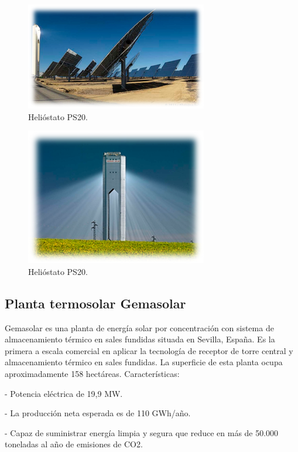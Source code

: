 \begin{figure}[h!]
  	\centering
	\includegraphics[scale=1]{FotosPaginasWebHeliostatos/unnamed(2).png}
	\caption{Helióstato PS20.
	\label{fig:FotosPaginasWebHeliostatos/unnamed(2).png}}
\end{figure}

\begin{figure}[h!]
  	\centering
	\includegraphics[scale=1]{FotosPaginasWebHeliostatos/unnamed(3).png}
	\caption{Helióstato PS20.
	\label{fig:FotosPaginasWebHeliostatos/unnamed(3).png}}
\end{figure}

\cite{ValenticampderrosWebSite}

\subsection{Planta termosolar Gemasolar}

Gemasolar es una planta de energía solar por concentración con sistema de almacenamiento térmico en sales fundidas situada en Sevilla, España. Es la primera a escala comercial en aplicar la tecnología de receptor de torre central y almacenamiento térmico en sales fundidas. La superficie de esta planta ocupa aproximadamente 158 hectáreas. Características:

- Potencia eléctrica de 19,9 MW.

- La producción neta esperada es de 110 GWh/año.

- Capaz de suministrar energía limpia y segura que reduce en más de 50.000 toneladas al año de emisiones de CO2.

